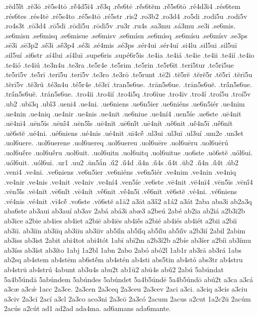 {.rĕd5ĭ́t
.rĕ3ō
.rĕ5s4tō
.rĕ́4d5ĭ4
.rĕ́3q
.rĕ́s6tē
.rĕ́s6tĕm
.rĕ́5s6tō
.ré4d3i4
.rés6tem
.rés6tes
.rés4tē
.ré5s4to
.ré5s4tō
.ré5str
.ris2
.ro3b2
.ro3d4
.ro5di
.rodi5u
.rodi5v
.ro4s3t
.rō3d4
.rō5dī
.rōdī5u
.rōdī5v
.ru3r
.ru4s
.sa3mu
.sá3mu
.se3i
.se6mis.
.se6misn
.se6misq
.se6misue
.se6misv
.se6mísn
.se6mísq
.se6mísu
.se6mísv
.se3ps
.sē3i
.sē3p2
.sḗ3i
.sḗ3p4
.sé3i
.sé4mis
.sé3ps
.sér4ui
.sér4uī
.si4lu
.sil5ui
.sil5uī
.sil5uí
.si6str
.sí4lui
.sí4luī
.supe6ris
.supé6r5is
.te4ia
.te4iá
.te4ie
.te4ii
.te4ií
.te4io
.te4ió
.te4iú
.te3n4u
.te3ra
.te5r4e
.te5rim
.te5rin
.te5r6it
.teri5tur
.te5ri5ue
.te5ri5v
.te5rī
.terī5u
.terī5v
.te3ro
.te3rō
.te5runt
.tē2i
.tĕ5rĕ
.tĕrĕ5r
.tĕ5rī
.tĕrī5u
.tĕrī5v
.tĕ3rŭ
.té3n4u
.té5r4e
.té3rī
.tran5s6ue.
.trān5s6ue.
.trān5s6uĕ.
.trā́n5s6ue.
.trā́n5s6uĕ.
.trán5s6ue.
.tro4ii
.tro4ií
.tro4i5q
.tro6iue
.tro4iv
.tro4í
.troí5u
.troí5v
.ub2
.ubī3q
.ubī́3
.ueni4
.ue4ni.
.ue6niens
.ue6n5ier
.ue6niéns
.ue6n5iér
.ue4nim
.ue4nin
.ue4niq
.ue4nir
.ue4nis
.ue4nit
.ue6niue
.ue4ní4
.uen5íe
.ue6ste
.uē4nit
.uē4nī4
.uēn5īs
.uēnī́4
.uēn5ī́s
.uē4nĭt
.uē6nĭ́t
.uē4nít
.uḗ6nit
.uḗ4n5ī
.uḗ6nĭt
.uĕ6stĕ
.ué4ni.
.ué6niens
.ué4nis
.ué4nit
.uī4cĕ́
.ul3ui
.ul3uī
.ul3uí
.um2e
.un3et
.uol6uere.
.uol6uerene
.uol6uereq
.uol6uereu
.uol6uēre
.uol6uēru
.uol6uērú
.uol6uḗre
.uol6uḗru
.uol6uit.
.uol6uitn
.uol6uitq
.uol6uitue
.uo6ste
.uŏ6stĕ
.uól6ui.
.uól6uit.
.uól6uī.
.ur1
.uu2
.ūn5ắn
.ū́2
.ū́4d
.ū́4n
.ū́4s
.ū́4t
.ŭb2
.ŭ́4n
.ŭ́4t
.úb2
.veni4
.ve4ni.
.ve6niens
.ve6n5ier
.ve6niéns
.ve6n5iér
.ve4nim
.ve4nin
.ve4niq
.ve4nir
.ve4nis
.ve4nit
.ve4niv
.ve4ní4
.ven5íe
.ve6ste
.vē4nit
.vē4nī4
.vēn5īs
.vēnī́4
.vēn5ī́s
.vē4nĭt
.vē6nĭ́t
.vē4nít
.vḗ6nit
.vḗ4n5ī
.vḗ6nĭt
.vĕ6stĕ
.vé4ni.
.vé6niens
.vé4nis
.vé4nit
.vī4cĕ́
.vo6ste
.vŏ6stĕ
a1ā2
a3āt
a3ā́2
a1á2
a3át
2aba
aba3i
ab2a3q
aba6ste
ab3aui
ab3auí
ab3av
2abá
abá3i
abæ3
a2beú
2abé
ab2ia
ab2iá
a2b3i2b
ab3ice
a2bie
ab4ies
ab4iet
a2biē
ab4iēs
ab4iḗs
a2bié
ab4iés
ab4iét
a2bii
a2biī
ab3iī.
ab3iīn
ab3iīq
ab3iīu
ab3iīv
ab5iī́n
ab5iī́q
ab5iī́u
ab5iī́v
a2b3ií
2abil
2abim
ab3iss
ab3ist
2abit
abi4tot
abi4tót
1abī
abī2m
a2b3í2b
a2bíe
ab3íer
a2bíi
ab3ímu
ab3íss
ab3íst
ab3íto
1abj
1a2bl
1abn
2abo
2abó
abó2l
1ab1r
ab3rā
ab3rá
1abs
ab2sq
ab4stem
ab4stēm
ab6stḗm
ab4stén
ab4sti
abs5tin
ab4stó
abs3tr
ab4stru
ab4strū
ab4strú
4abunt
ab3u4s
abu2t
ab1ū2
abū4s
abū́2
2abú
5abúndat
5a4b5úndā
5abúndem
5abúndes
5abúndet
5a4b5úndē
5a4b5úndō
abú2t
a3ca
a3cá
a3cæ
a3cǽ
1acc
2a3ce.
2a3cen
2a3ceq
2a3ceu
2a3cev
2aci
a3ci.
a3ciq
a3cis
a3ciu
a3civ
2a3cī
2ací
a3cl
2a3co
aco3ni
2a3cō
2a3có
2acum
2acus
a2cut
1a2c2ū
2acúm
2acús
a2cút
ad1
ad2ad
ada4ma.
ad6amans
ada6mante.
}
